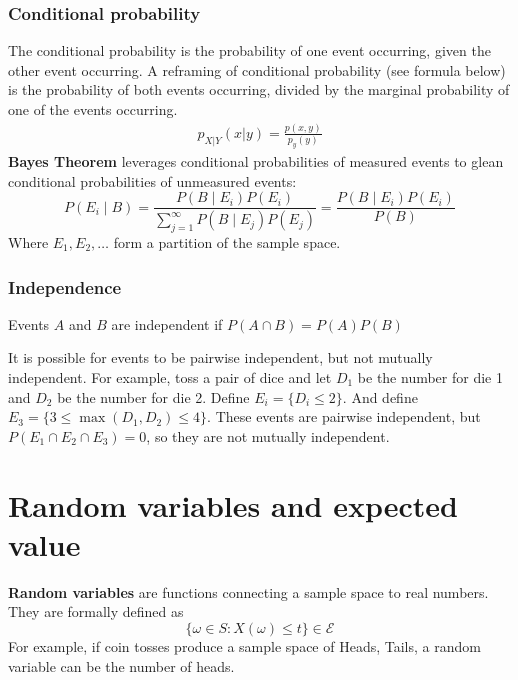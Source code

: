 \documentclass{article}
\begin{document}
\subsubsection{Conditional probability}
The conditional probability is the probability of one event occurring, given the other event occurring. A reframing of conditional probability (see formula below) is the probability of both events occurring, divided by the marginal probability of one of the events occurring. 
\begin{align*}
    p_{X|Y}(x|y) = \frac{p(x,y)}{p_y(y)}
\end{align*}
\textbf{Bayes Theorem} leverages conditional probabilities of measured events to glean conditional probabilities of unmeasured events:
\begin{equation*}
    P(E_i \mid B) = \frac{P(B \mid E_i)P(E_i)}{\sum_{j=1}^\infty P(B \mid E_j)P(E_j)} = \frac{P(B \mid E_i)P(E_i)}{P(B)}
\end{equation*}
Where $E_1, E_2, \dots$ form a partition of the sample space.

\subsubsection{Independence}
Events $A$ and $B$ are independent if $P(A\cap B) = P(A)P(B)$

It is possible for events to be pairwise independent, but not mutually independent. For example, toss a pair of dice and let $D_1$ be the number for die 1 and $D_2$ be the number for die 2. Define $E_i = \{D_i \leq 2\}$. And define $E_3 = \{ 3 \leq \max(D_1, D_2) \leq 4 \}$. These events are pairwise independent, but $P(E_1\cap E_2 \cap E_3) = 0$, so they are not mutually independent. 

\section{Random variables and expected value}
\textbf{Random variables} are functions connecting a sample space to real numbers. They are formally defined as
\begin{equation*}
    \{ \omega \in S : X(\omega) \leq t \} \in \mathcal{E}
\end{equation*}
For example, if coin tosses produce a sample space of {Heads, Tails}, a random variable can be the number of heads. 
\end{document}
